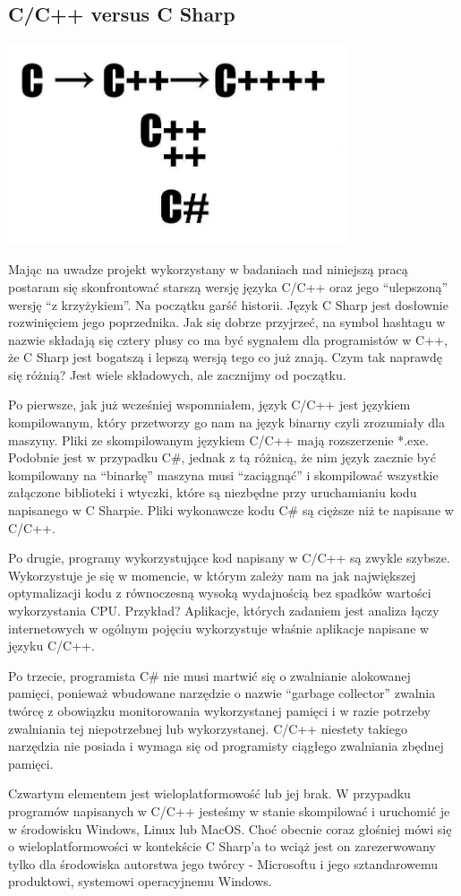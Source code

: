 \documentclass{article}
\begin{document}
\subsection{C/C++ versus C Sharp}
\begin{center}
	\includegraphics[width=10cm]{cvscsharp}
\end{center}
\par
Mając na uwadze projekt wykorzystany w badaniach nad niniejszą pracą postaram się skonfrontować starszą wersję języka C/C++ oraz jego “ulepszoną” wersję “z krzyżykiem”. Na początku garść historii. Język C Sharp jest dosłownie rozwinięciem jego poprzednika. Jak się dobrze przyjrzeć, na symbol hashtagu w nazwie składają się cztery plusy co ma być sygnałem dla programistów w C++, że C Sharp jest bogatszą i lepszą wersją tego co już znają. Czym tak naprawdę się różnią? Jest wiele składowych, ale zacznijmy od początku.
\par
Po pierwsze, jak już wcześniej wspomniałem, język C/C++ jest językiem kompilowanym, który przetworzy go nam na język binarny czyli zrozumiały dla maszyny. Pliki ze skompilowanym językiem C/C++ mają rozszerzenie *.exe. Podobnie jest w przypadku C#, jednak z tą różnicą, że nim język zacznie być kompilowany na “binarkę” maszyna musi “zaciągnąć” i skompilować wszystkie załączone biblioteki i wtyczki, które są niezbędne przy uruchamianiu kodu napisanego w C Sharpie. Pliki wykonawcze kodu C# są cięższe niż te napisane w C/C++.
\par
Po drugie, programy wykorzystujące kod napisany w C/C++ są zwykle szybsze. Wykorzystuje je się w momencie, w którym zależy nam na jak największej optymalizacji kodu z równoczesną wysoką wydajnością bez spadków wartości wykorzystania CPU. Przykład? Aplikacje, których zadaniem jest analiza łączy internetowych w ogólnym pojęciu wykorzystuje właśnie aplikacje napisane w języku C/C++.
\par
Po trzecie, programista C# nie musi martwić się o zwalnianie alokowanej pamięci, ponieważ wbudowane narzędzie o nazwie “garbage collector” zwalnia twórcę z obowiązku monitorowania wykorzystanej pamięci i w razie potrzeby zwalniania tej niepotrzebnej lub wykorzystanej. C/C++ niestety takiego narzędzia nie posiada i wymaga się od programisty ciągłego zwalniania zbędnej pamięci.
\par
Czwartym elementem jest wieloplatformowość lub jej brak. W przypadku programów napisanych w C/C++ jesteśmy w stanie skompilować i uruchomić je w środowisku Windows, Linux lub MacOS. Choć obecnie coraz głośniej mówi się o wieloplatformowości w kontekście C Sharp’a to wciąż jest on zarezerwowany tylko dla środowiska autorstwa jego twórcy - Microsoftu i jego sztandarowemu produktowi, systemowi operacyjnemu Windows.
\end{document}
